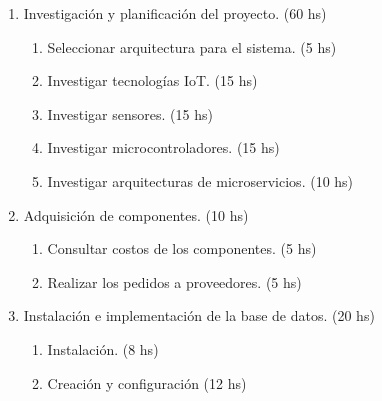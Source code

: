 \documentclass[
11pt, %
]{charter}
\begin{document}
\begin{enumerate}
\item Investigación y planificación del proyecto. (60 hs)
	\begin{enumerate}
	\item Seleccionar arquitectura para el sistema. (5 hs)
	\item Investigar tecnologías IoT. (15 hs)
	\item Investigar sensores. (15 hs)
	\item Investigar microcontroladores. (15 hs)
	\item Investigar arquitecturas de microservicios. (10 hs)
	\end{enumerate}
\item Adquisición de componentes. (10 hs)
	\begin{enumerate}
	\item Consultar costos de los componentes. (5 hs)
	\item Realizar los pedidos a proveedores. (5 hs)
	\end{enumerate}
\item Instalación e implementación de la base de datos. (20 hs)
	\begin{enumerate}
	\item Instalación. (8 hs)
	\item Creación y configuración (12 hs)


\end{enumerate}
\end{enumerate}
\end{document}
